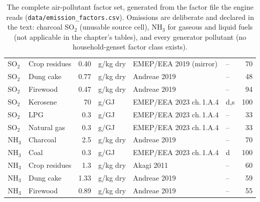 \begin{table}[htbp]
\begin{tabular}{@{}llrlllr@{}}
SO$_2$ & Crop residues & 0.40 & g/kg dry & EMEP/EEA 2019 (mirror) & -- & 70 \\
SO$_2$ & Dung cake & 0.77 & g/kg dry & Andreae 2019 & -- & 48 \\
SO$_2$ & Firewood & 0.47 & g/kg dry & Andreae 2019 & -- & 94 \\
SO$_2$ & Kerosene & 70 & g/GJ & EMEP/EEA 2023 ch.\,1.A.4 & d,s & 100 \\
SO$_2$ & LPG & 0.3 & g/GJ & EMEP/EEA 2023 ch.\,1.A.4 & -- & 33 \\
SO$_2$ & Natural gas & 0.3 & g/GJ & EMEP/EEA 2023 ch.\,1.A.4 & -- & 33 \\
NH$_3$ & Charcoal & 2.5 & g/kg dry & Andreae 2019 & -- & 70 \\
NH$_3$ & Coal & 0.3 & g/GJ & EMEP/EEA 2023 ch.\,1.A.4 & d & 100 \\
NH$_3$ & Crop residues & 1.3 & g/kg dry & Akagi 2011 & -- & 60 \\
NH$_3$ & Dung cake & 1.33 & g/kg dry & Andreae 2019 & -- & 59 \\
NH$_3$ & Firewood & 0.89 & g/kg dry & Andreae 2019 & -- & 55 \\
\bottomrule
\end{tabular}
\caption{The complete air-pollutant factor set, generated from the factor
file the engine reads (\texttt{data/emission\_factors.csv}). Omissions are
deliberate and declared in the text: charcoal SO$_2$ (unusable source cell),
NH$_3$ for gaseous and liquid fuels (not applicable in the chapter's tables),
and every generator pollutant (no household-genset factor class exists).}
\label{tab:factors}
\end{table}
